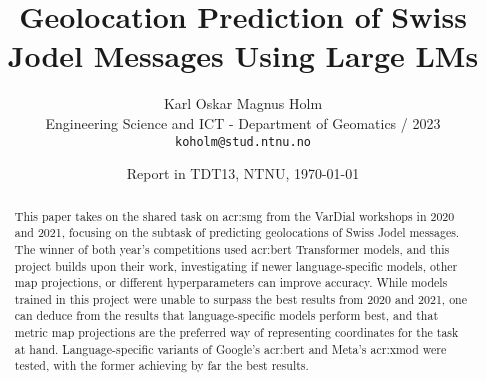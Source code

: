 \documentclass[11pt]{article}
\title{Geolocation Prediction of Swiss Jodel Messages Using Large LMs}
\author{Karl Oskar Magnus Holm \\
  Engineering Science and ICT - Department of Geomatics / 2023 \\
  {\tt koholm@stud.ntnu.no} \\}
\date{Report in TDT13, NTNU, \today}
\begin{document}
\maketitle


\begin{abstract}
    \begin{comment}
    This paper provides a template for writing a Project Report in TDT13, Advanced Text Analytics and Language Understanding.
    The document itself conforms to its own specifications and is thus an example of what your manuscript should look like.
    The template does not form a compulsory style that you are obliged to use, but rather provides a common starting point for all students.
    For a given report, tuning of the template may still be required, depending on the nature of the report and the author's writing style.
    Such tuning might involve moving a section to a subsection or vice versa, or removing or adding sections and subsections.

    Note that the template contains a lot of examples of how to write different parts of the report
    as well as how to cite authors and how to use LaTeX and BibTeX.
    Some of those examples might only be clear if you actually look at the LaTeX source itself.

    The abstract is your sales pitch which encourages people to read your work,
    but unlike sales it should be realistic with respect to the contributions of the work.
    It should include:
    \begin{itemize}
        \item what the research topic is,
        \item the research approach(es) applied, and
        \item contributions.
    \end{itemize}

    The abstract should not exceed 200 words.
    Do not include lists, tables or figures.
    Avoid abbreviations and references.
    \end{comment}

    This paper takes on the shared task on \acrfull{acr:smg} from the VarDial workshops in 2020 and 2021, focusing on the subtask of predicting geolocations of Swiss Jodel messages. The winner of both year's competitions used \acrshort{acr:bert} Transformer models, and this project builds upon their work, investigating if newer language-specific models, other map projections, or different hyperparameters can improve accuracy. While models trained in this project were unable to surpass the best results from 2020 and 2021, one can deduce from the results that language-specific models perform best, and that metric map projections are the preferred way of representing coordinates for the task at hand. Language-specific variants of Google's \acrshort{acr:bert} and Meta's \acrshort{acr:xmod} were tested, with the former achieving by far the best results.
\end{abstract}
\end{document}
